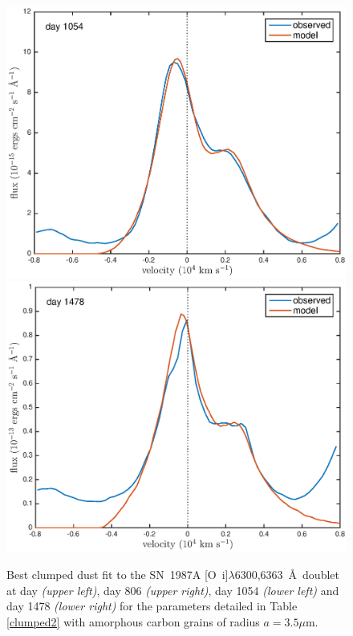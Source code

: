 \documentclass[useAMS,usenatbib,usegraphicx]{mnras}
\begin{document}
\begin{figure}
\begin{center}
\includegraphics[trim =37 10 45 15,clip=true,scale=0.41]{clump_1/maximum/d1054OI}
\includegraphics[trim =37 10 45 15,clip=true,scale=0.41]{clump_1/maximum/d1478OI}
\caption{Best clumped dust fit to the SN~1987A [O~{\sc i}]$\lambda$6300,6363~\AA\ doublet at day \textit{(upper left)}, day 806 \textit{(upper right)}, day 1054 \textit{(lower left)} and day 1478 \textit{(lower right)} for the parameters detailed in Table \ref{clumped2} with amorphous carbon grains of radius $a=3.5 \mu$m.}
\label{OI_clump1}
\end{center}
\end{figure}
\end{document}

